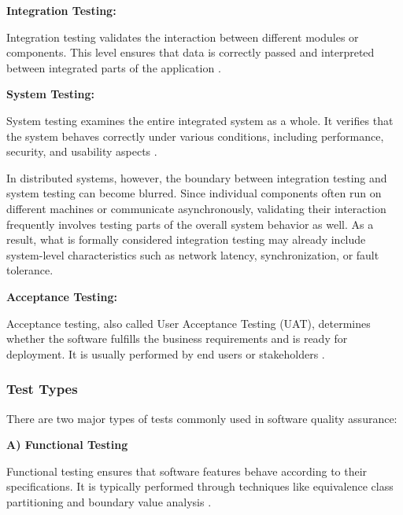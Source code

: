 \vspace{1em}
\textbf{Integration Testing:}

\vspace{0.4em}
Integration testing validates the interaction between different modules or components. This level ensures that data is correctly passed and interpreted between integrated parts of the application \cite{burnstein2003practical}.

\newpage

\textbf{System Testing:}

\vspace{0.4em}
System testing examines the entire integrated system as a whole. It verifies that the system behaves correctly under various conditions, including performance, security, and usability aspects \cite{myers2011art}.

\vspace{1em}
In distributed systems, however, the boundary between integration testing and system testing can become blurred. Since individual components often run on different machines or communicate asynchronously, validating their interaction frequently involves testing parts of the overall system behavior as well. As a result, what is formally considered integration testing may already include system-level characteristics such as network latency, synchronization, or fault tolerance.

\vspace{1em}
\textbf{Acceptance Testing:}

\vspace{0.4em}
Acceptance testing, also called User Acceptance Testing (UAT), determines whether the software fulfills the business requirements and is ready for deployment. It is usually performed by end users or stakeholders \cite{kaner1999testing}.
\vspace{0.2em}

\subsubsection{Test Types}

There are two major types of tests commonly used in software quality assurance:

\vspace{1em}
\textbf{A) Functional Testing}

\vspace{0.4em}
Functional testing ensures that software features behave according to their specifications. It is typically performed through techniques like equivalence class partitioning and boundary value analysis \cite{pressman2014software}.

